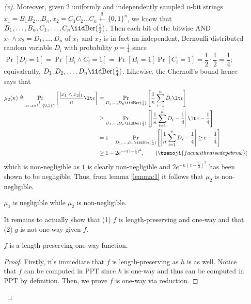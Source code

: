 \begin{proof}[(v)]
    Moreover, given $2$ uniformly and independently sampled $n$-bit strings $x_1=B_1B_2\ldots B_n, x_2=C_1C_2\ldots C_n \xleftarrow{\$}\{0,1\}^n$, we know that $B_1,\ldots, B_n,C_1,\ldots, C_n \iid \mathrm{Ber}(\frac{1}{2})$. Then each bit of the bitwise AND $x_1\land x_2=D_1,\ldots, D_n$ of $x_1$ and $x_2$ is in fact an independent, Bernoulli distributed random variable $D_i$ with probability $p=\frac{1}{4}$ since $\Pr[D_i=1]=\Pr[B_i\land C_i=1]=\Pr[B_i=1]\Pr[C_i=1]=\dfrac{1}{2}\cdot \dfrac{1}{2}=\dfrac{1}{4}$; equivalently, $D_1,D_2,\ldots, D_n \iid \mathrm{Ber}(\frac{1}{4})$. Likewise, the Chernoff's bound hence says that
    \begin{align*}
    \mu_2(n)\triangleq\Pr\limits_{x_1,x_2\xleftarrow{\$}\{0,1\}^n}\left[\dfrac{|x_1\land x_2|_1}{n}\lt c\right]
    &= \Pr\limits_{D_1,\ldots, D_n \iid \mathrm{Ber}(\frac{1}{4})}\left[\frac{1}{n} \sum_{i=1}^n D_i\lt c\right]\\
    &\ge \Pr\limits_{D_1,\ldots, D_n \iid \mathrm{Ber}(\frac{1}{4})}\left[\left|\frac{1}{n} \sum_{i=1}^n D_i - \frac{1}{4} \right|\lt c-\frac{1}{4}\right]\\
    &= 1-\Pr\limits_{D_1,\ldots, D_n \iid \mathrm{Ber}(\frac{1}{4})}\left[\left|\frac{1}{n} \sum_{i=1}^n D_i - \frac{1}{4} \right|\ge c-\frac{1}{4}\right]\\
    &\ge 1- 2e^{-n (c-\frac{1}{4})^2}, \tag{$\twemoji{face with raised eyebrow}$}
    \end{align*}
    which is non-negligible as $1$ is clearly non-negligible and $2e^{-n (c-\frac{1}{4})^2}$ has been shown to be negligible. Thus, from lemma \ref{lemma:1} it follows that $\mu_2$ is non-negligible.

    \begin{observation}\label{obs:v-1}
        $\mu_1$ is negligible while $\mu_2$ is non-negligible.
    \end{observation}

    It remains to actually show that (1) $f$ is length-preserving and one-way and that (2) $g$ is not one-way given $f$.

    \begin{claim}
        \label{clm:v-1}
        $f$ is a length-preserving one-way function.
    \end{claim}
    \begin{proof}
        Firstly, it's immediate that $f$ is length-preserving as $h$ is as well. Notice that $f$ can be computed in PPT since $h$ is one-way and thus can be computed in PPT by definition. Then, we prove $f$ is one-way via reduction.


\end{proof}
\end{proof}
